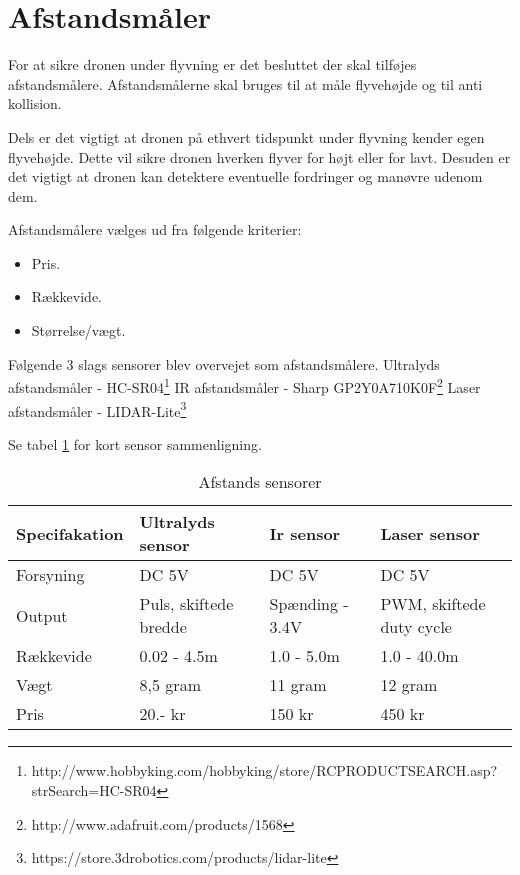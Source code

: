 \section{Afstandsmåler}

For at sikre dronen under flyvning er det besluttet der skal tilføjes afstandsmålere. Afstandsmålerne skal bruges til at måle flyvehøjde og til anti kollision.

Dels er det vigtigt at dronen på ethvert tidspunkt under flyvning kender egen flyvehøjde. Dette vil sikre dronen hverken flyver for højt eller for lavt. Desuden er det vigtigt at dronen kan detektere eventuelle fordringer og manøvre udenom dem.

Afstandsmålere vælges ud fra følgende kriterier:  
\begin{itemize}
	\item Pris.
	\item Rækkevide. 
	\item Størrelse/vægt. 
\end{itemize}

\vspace{0.5cm}

Følgende 3 slags sensorer blev overvejet som afstandsmålere. \newline Ultralyds afstandsmåler - HC-SR04\footnote{http://www.hobbyking.com/hobbyking/store/RC\textunderscore PRODUCT\textunderscore SEARCH.asp?strSearch=HC-SR04}  \newline IR afstandsmåler - Sharp GP2Y0A710K0F\footnote{http://www.adafruit.com/products/1568}  \newline Laser afstandsmåler - LIDAR-Lite\footnote{https://store.3drobotics.com/products/lidar-lite}

\vspace{0.5cm}

Se tabel \ref{tab:Afstands_sensorer} for kort sensor sammenligning.

\begin{table}[H]
	\centering
		\begin{tabular}{|p{2.8cm}|p{3.4 cm}|p{3.4 cm}|p{3.4 cm}|} 
		\hline
			\textbf{Specifakation} 	& \textbf{Ultralyds sensor} 	& \textbf{Ir sensor} 		& \textbf{Laser sensor} \\ \hline
			 Forsyning 				& DC 5V 						& DC 5V 					& DC 5V \\ \hline			 
			 Output 				& Puls, \newline skiftede bredde 		& Spænding \newline 1.4 - 3.4V 		& PWM, \newline skiftede duty cycle\\ \hline
			 Rækkevide 					& 0.02 - 4.5m 					& 1.0 - 5.0m 				& 1.0 - 40.0m \\ \hline
			 Vægt 					& 8,5 gram 						& 11 gram 					& 12 gram \\ \hline
		 	 Pris 					& 20.- kr 						& 150 kr 					& 450 kr \\ \hline			 
		\end{tabular}
	\caption{Afstands sensorer}
	\label{tab:Afstands_sensorer}
\end{table}

